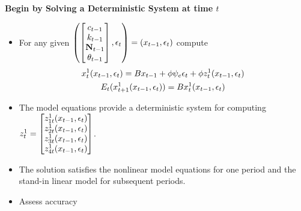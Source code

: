 \documentclass[12pt]{article}
\begin{document}

  






  {\bf Begin by Solving a Deterministic System at time $t$}

{\small

  \begin{itemize}
  \item For any given $\left (  \begin{bmatrix}
c_{t-1}\\k_{t-1}\\ {\mathbf{N}}_{t-1}\\\theta_{t-1}
  \end{bmatrix}, \epsilon_t \right )=(x_{t-1},\epsilon_t)$ 
compute
  \begin{gather}
    \label{eq:3}
    x_t^1(x_{t-1},\epsilon_t)=B x_{t-1} + \phi \psi_e\epsilon_t + \phi z^1_t(x_{t-1},\epsilon_t)\\
    E_t(x^1_{t+1}(x_{t-1},\epsilon_t))=B x^1_{t}(x_{t-1},\epsilon_t)
  \end{gather}
\item The model equations provide a deterministic system  for computing $  z^1_t=\begin{bmatrix}
    z^1_{1t}(x_{t-1},\epsilon_t)\\
    z^1_{2t}(x_{t-1},\epsilon_t)\\
    z^1_{3t}(x_{t-1},\epsilon_t)\\
    z^1_{4t}(x_{t-1},\epsilon_t)
  \end{bmatrix}$.
\item The solution satisfies the nonlinear model equations for one 
period and the stand-in linear model for subsequent periods.
\item Assess accuracy
  \end{itemize}
}





\end{document}
